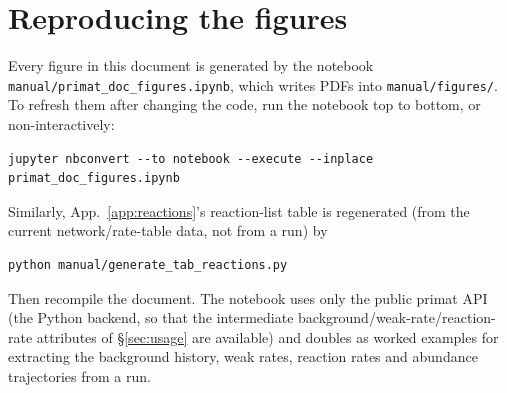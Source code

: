 \documentclass[11pt,a4paper]{article}
\newcommand{\code}[1]{\texttt{#1}}
\begin{document}


\section{Reproducing the figures}
Every figure in this document is generated by the notebook
\code{manual/primat\_doc\_figures.ipynb}, which writes PDFs into
\code{manual/figures/}. To refresh them after changing the code, run the notebook
top to bottom, or non-interactively:
\begin{lstlisting}[style=sh]
jupyter nbconvert --to notebook --execute --inplace primat_doc_figures.ipynb
\end{lstlisting}
Similarly, App.~\ref{app:reactions}'s reaction-list table is regenerated (from
the current network/rate-table data, not from a run) by
\begin{lstlisting}[style=sh]
python manual/generate_tab_reactions.py
\end{lstlisting}
Then recompile the document. The notebook uses only the public primat API
(the Python backend, so that the intermediate background/weak-rate/reaction-rate
attributes of \S\ref{sec:usage} are available) and doubles as worked examples
for extracting the background history, weak rates, reaction rates and
abundance trajectories from a run.
\end{document}
